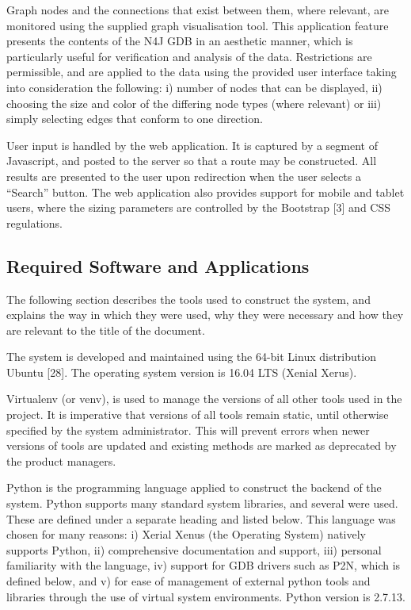 \documentclass[12pt]{article}   	%
\begin{document}
Graph nodes and the connections that exist between them, where relevant, are monitored using the supplied graph visualisation tool. This application feature presents the contents of the N4J GDB in an aesthetic manner, which is particularly useful for verification and analysis of the data. Restrictions are permissible, and are applied to the data using the provided user interface taking into consideration the following: i) number of nodes that can be displayed, ii) choosing the size and color of the differing node types (where relevant) or iii) simply selecting edges that conform to one direction.

User input is handled by the web application. It is captured by a segment of Javascript, and posted to the server so that a route may be constructed. All results are presented to the user upon redirection when the user selects a “Search” button. The web application also provides support for mobile and tablet users, where the sizing parameters are controlled by the Bootstrap [3] and CSS regulations.

\subsection{Required Software and Applications}
The following section describes the tools used to construct the system, and explains the way in which they were used, why they were necessary and how they are relevant to the title of the document.

The system is developed and maintained using the 64-bit Linux distribution Ubuntu [28]. The operating system version is 16.04 LTS (Xenial Xerus).

Virtualenv (or venv), is used to manage the versions of all other tools used in the project. It is imperative that versions of all tools remain static, until otherwise specified by the system administrator. This will prevent errors when newer versions of tools are updated and existing methods are marked as deprecated by the product managers.

Python is the programming language applied to construct the backend of the system. Python supports many standard system libraries, and several were used. These are defined under a separate heading and listed below. This language was chosen for many reasons: i) Xerial Xenus (the Operating System) natively supports Python, ii) comprehensive documentation and support, iii) personal familiarity with the language, iv) support for GDB drivers such as P2N, which is defined below, and v) for ease of management of external python tools and libraries through the use of virtual system environments. Python version is 2.7.13.
\end{document}

